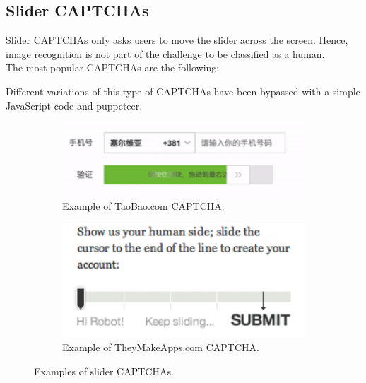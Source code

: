 \subsection{Slider CAPTCHAs}
Slider CAPTCHAs only asks users to move the slider across the screen. Hence, image recognition is not part of the challenge to be classified as a human.\\
The most popular CAPTCHAs are the following:
\begin{itemize}
\end{itemize}
Different variations of this type of CAPTCHAs have been bypassed with a simple JavaScript code and puppeteer.
\begin{figure}[h]
     \centering
     \begin{subfigure}[b]{0.48\textwidth}
         \centering
         \includegraphics[width=.8\linewidth]{Images/StateOfArt/taobao_CAPTCHA}
                  \caption{\footnotesize{Example of TaoBao.com CAPTCHA.}}
         \label{soa:slider}
     \end{subfigure}
     \hfill
     \begin{subfigure}[b]{0.48\textwidth}
         \centering
         \includegraphics[width=.8\linewidth]{Images/StateOfArt/theyMakeApps_CAPTCHA}
         \caption{\footnotesize{Example of TheyMakeApps.com CAPTCHA.}}
        \label{soa:slider2}
     \end{subfigure}
     \caption{\footnotesize{Examples of slider CAPTCHAs.}}
\end{figure}


